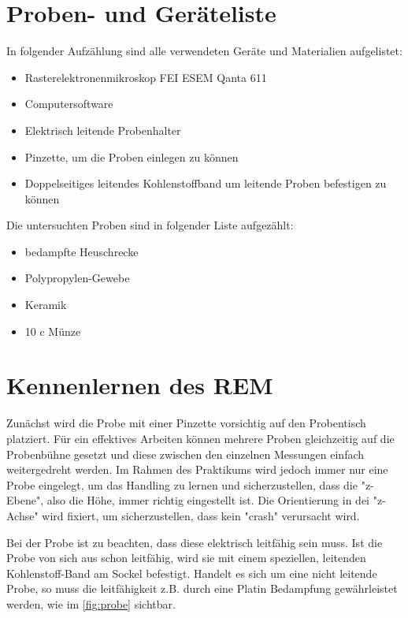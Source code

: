 \documentclass[12pt,english,ngerman]{scrartcl}
\begin{document}
\section{Proben- und Geräteliste}

In folgender Aufzählung sind alle verwendeten Geräte und Materialien aufgelistet:
\begin{itemize}
	\item Rasterelektronenmikroskop FEI ESEM Qanta 611
	\item Computersoftware
	\item Elektrisch leitende Probenhalter
	\item Pinzette, um die Proben einlegen zu können
	\item Doppelseitiges leitendes Kohlenstoffband um leitende Proben befestigen zu können
\end{itemize}

\newpage

Die untersuchten Proben sind in folgender Liste aufgezählt:

\begin{itemize}
	\item bedampfte Heuschrecke
	\item Polypropylen-Gewebe
	\item Keramik
	\item 10 c Münze
\end{itemize}

\section{Kennenlernen des REM}


Zunächst wird die Probe mit einer Pinzette vorsichtig auf den Probentisch platziert. Für ein effektives Arbeiten können 
mehrere Proben gleichzeitig auf die Probenbühne gesetzt und diese zwischen den einzelnen Messungen einfach weitergedreht
werden. Im Rahmen des Praktikums wird jedoch immer nur eine Probe eingelegt, um das Handling zu lernen und sicherzustellen,
dass die "z-Ebene", also die Höhe, immer richtig eingestellt ist. Die Orientierung in dei "z-Achse" wird fixiert, um 
sicherzustellen, dass kein "crash" verursacht wird.

Bei der Probe ist zu beachten, dass diese elektrisch leitfähig sein muss. Ist die Probe von sich aus schon leitfähig, wird
sie mit einem speziellen, leitenden Kohlenstoff-Band am Sockel befestigt. Handelt es sich um eine nicht leitende Probe, so 
muss die leitfähigkeit z.B. durch eine Platin Bedampfung gewährleistet werden, wie im \autoref{fig:probe} sichtbar.
\end{document}
